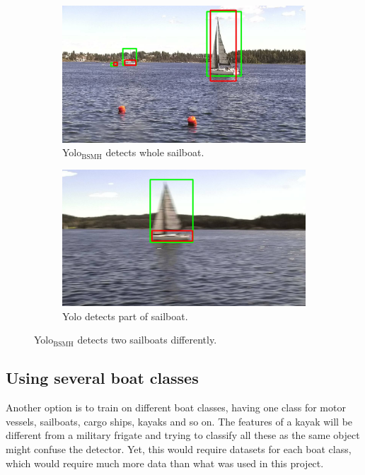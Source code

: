 \begin{figure}[h!]
\begin{subfigure}{.5\textwidth}
  \centering
  \includegraphics[width=0.8\linewidth]{discussion/sailboat/selected_06_25_frame0349.jpg}
  \caption{Yolo$_{\text{BSMH}}$ detects whole sailboat.}
  \label{fig:yolo3_sailboat_whol}
\end{subfigure}%
\begin{subfigure}{.5\textwidth}
  \centering
  \includegraphics[width=.8\linewidth]{discussion/sailboat/selected_06_25_frame0340.jpg}
  \caption{Yolo detects part of sailboat.}
  \label{fig:yolo3_sailboat_part}
\end{subfigure}
\caption{Yolo$_{\text{BSMH}}$ detects two sailboats differently.}
\label{fig:yolo3_sailboat}
\end{figure}


\subsection{Using several boat classes}
Another option is to train on different boat classes, having one class for motor vessels, sailboats, cargo ships, kayaks and so on. The features of a kayak will be different from a military frigate and trying to classify all these as the same object might confuse the detector. Yet, this would require datasets for each boat class, which would require much more data than what was used in this project.

